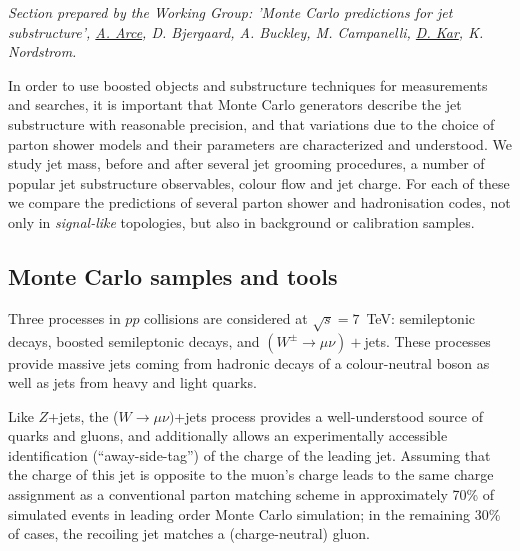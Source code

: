 
{\it Section prepared by the Working Group: 'Monte Carlo predictions for jet substructure', \underline{A. Arce}, D. Bjergaard, A. Buckley, M. Campanelli, \underline{D. Kar}, K. Nordstrom.
}



In order to use boosted objects and substructure techniques for measurements and
searches, it is important that Monte Carlo generators describe the jet
substructure with reasonable precision, and that
variations due to the choice of parton shower models and their
parameters are characterized and understood.  
We study jet mass, before and after several jet grooming procedures,
a number of popular jet substructure observables, colour flow and jet charge.
For each of these we compare the predictions of 
several parton shower and hadronisation codes, not only in 
\emph{signal-like} topologies, but also in
background or calibration samples.  



\subsection{Monte Carlo samples and tools}


Three processes in $pp$ collisions are considered
at $\sqrt{s}=7$~TeV: semileptonic \ttbar decays, boosted 
semileptonic \ttbar decays, and $(W^\pm \rightarrow \mu\nu)+$jets.
These processes provide massive jets coming from hadronic decays of a
colour-neutral boson as well as jets from heavy and light quarks. 

Like $Z$+jets, the  ($W\rightarrow \mu\nu)$+jets 
process provides a well-understood source of quarks and gluons, 
and additionally allows an experimentally accessible identification 
(``away-side-tag'') of the charge of the leading jet.  
Assuming that the charge of this jet is opposite to the muon's 
charge leads to the same charge assignment as a conventional parton matching scheme in approximately 70\% of simulated events in leading order Monte Carlo simulation; 
in the remaining 30\% of cases, the recoiling jet matches a (charge-neutral) gluon.

